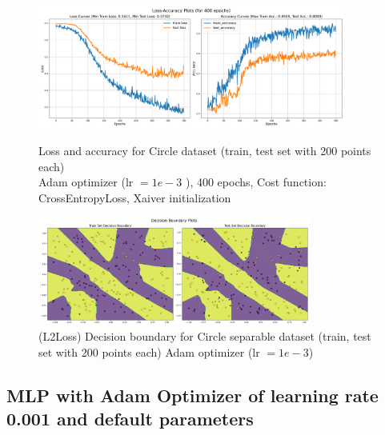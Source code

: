 \begin{solve}
\begin{figure}[H]
    \centering
    \includegraphics[width=0.9\textwidth]{plots/sinusoid_adam-lr-1e-3_more_layersloss_acc.png}
    \caption{Loss and accuracy for Circle dataset (train, test set with 200 points each)\\ Adam optimizer (lr $=1e-3$ ), 400 epochs, Cost function: CrossEntropyLoss, Xaiver initialization}
    \includegraphics[width=0.8\textwidth]{plots/sinusoid_adam-lr-1e-3_more_layersboundary.png}
    \caption{(L2Loss) Decision boundary for Circle separable dataset (train, test set with 200 points each) 
    Adam optimizer (lr $=1e-3$)}
\end{figure}





\subsection{MLP with Adam Optimizer of learning rate 0.001 and default parameters}


\end{solve}

